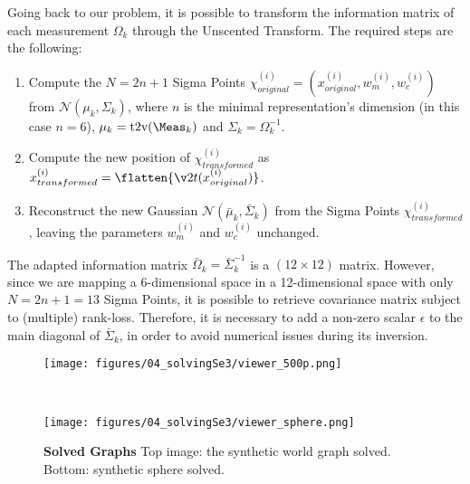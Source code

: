 Going back to our problem, it is possible to transform the information matrix of each measurement $\Omega_k$ through the Unscented Transform. The required steps are the following:

\begin{enumerate}
    \item Compute the $N = 2n+1$ Sigma Points $\chi_{original}^{(i)} = (x_{original}^{(i)}, w_m^{(i)}, w_c^{(i)})$ from $\mathcal{N}(\mu_k, \Sigma_k)$, where $n$ is the minimal representation's dimension (in this case $n = 6$), $\mu_k = \text{t2v}(\Meas_{k})$ and $\Sigma_k = \Omega_k^{-1}$.
    \item Compute the new position of $\chi_{transformed}^{(i)}$ as $x_{transformed}^{(i)} = \flatten{\v2t(x_{original}^{(i)})}$.
    \item Reconstruct the new Gaussian $\mathcal{N}(\bar{\mu}_k, \bar{\Sigma}_k)$ from the Sigma Points $\chi_{transformed}^{(i)}$, leaving the parameters $w_m^{(i)}$ and $w_c^{(i)}$ unchanged.
\end{enumerate}

The adapted information matrix $\bar{\Omega}_k = \bar{\Sigma}_k^{-1}$ is a $(12\times12)$ matrix. However, since we are mapping a 6-dimensional space in a 12-dimensional space with only $N = 2n + 1 = 13$ Sigma Points, it is possible to retrieve covariance matrix subject to (multiple) rank-loss. Therefore, it is necessary to add a non-zero scalar $\epsilon$ to the main diagonal of $\bar{\Sigma}_k$, in order to avoid numerical issues during its inversion.

\begin{figure}[!hbt]
    \centering
    \begin{minipage}[t!]{0.9\textwidth}
        \centering
        \texttt{[image: figures/04\_solvingSe3/viewer\_500p.png]}
        \subcaption{}
        \label{fig:500p_solved}
    \end{minipage}\\
    \begin{minipage}[t!]{0.9\textwidth}
        \centering
        \texttt{[image: figures/04\_solvingSe3/viewer\_sphere.png]}
        \subcaption{}
        \label{fig:sphere_solved}
    \end{minipage}%
    
    \caption{\textbf{Solved Graphs} Top image: the synthetic world graph solved. Bottom: synthetic sphere solved.} 
    \label{fig:solved_graphs}
\end{figure}


